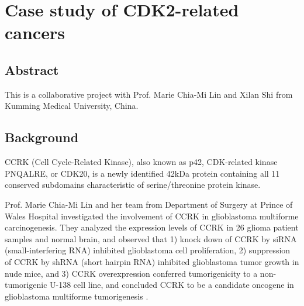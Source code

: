 \chapter{Case study of CDK2-related cancers}

\section{Abstract}

This is a collaborative project with Prof. Marie Chia-Mi Lin and Xilan Shi from Kumming Medical University, China.


\section{Background}

CCRK (Cell Cycle-Related Kinase), also known as p42, CDK-related kinase PNQALRE, or CDK20, is a newly identified 42kDa protein containing all 11 conserved subdomains characteristic of serine/threonine protein kinase.

Prof. Marie Chia-Mi Lin and her team from Department of Surgery at Prince of Wales Hospital investigated the involvement of CCRK in glioblastoma multiforme carcinogenesis. They analyzed the expression levels of CCRK in 26 glioma patient samples and normal brain, and observed that 1) knock down of CCRK by siRNA (small-interfering RNA) inhibited glioblastoma cell proliferation, 2) suppression of CCRK by shRNA (short hairpin RNA) inhibited glioblastoma tumor growth in nude mice, and 3) CCRK overexpression conferred tumorigenicity to a non-tumorigenic U-138 cell line, and concluded CCRK to be a candidate oncogene in glioblastoma multiforme tumorigenesis \citep{1144}.

